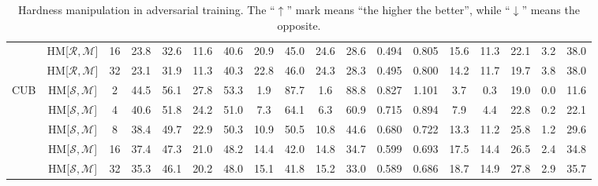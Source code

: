 \begin{table*}
{\begin{tabular}{c|cc|cccc|ccccc|ccccc|c}
\rowcolor{black!7}\cellcolor{white} & HM{[}$\mathcal{R},\mathcal{M}${]}  & 16 & 23.8 & 32.6 & 11.6 & 40.6 & 20.9 & 45.0 & 24.6 & 28.6 & 0.494 & 0.805 & 15.6 & 11.3 & 22.1 & 3.2 & 38.0\tabularnewline
 & HM{[}$\mathcal{R},\mathcal{M}${]} & 32 & 23.1 & 31.9 & 11.3 & 40.3 & 22.8 & 46.0 & 24.3 & 28.3 & 0.495 & 0.800 & 14.2 & 11.7 & 19.7 & 3.8 & 38.0\tabularnewline
\hline
\multirow{5}{*}{CUB} & HM{[}$\mathcal{S},\mathcal{M}${]} & 2 & 44.5 & 56.1 & 27.8 & 53.3 & 1.9 & 87.7 & 1.6 & 88.8 & 0.827 & 1.101 & 3.7 & 0.3 & 19.0 & 0.0 & 11.6\tabularnewline
\rowcolor{black!7}\cellcolor{white} & HM{[}$\mathcal{S},\mathcal{M}${]} & 4 & 40.6 & 51.8 & 24.2 & 51.0 & 7.3 & 64.1 & 6.3 & 60.9 & 0.715 & 0.894 & 7.9 & 4.4 & 22.8 & 0.2 & 22.1\tabularnewline
 & HM{[}$\mathcal{S},\mathcal{M}${]} & 8 & 38.4 & 49.7 & 22.9 & 50.3 & 10.9 & 50.5 & 10.8 & 44.6 & 0.680 & 0.722 & 13.3 & 11.2 & 25.8 & 1.2 & 29.6\tabularnewline
\rowcolor{black!7}\cellcolor{white} & HM{[}$\mathcal{S},\mathcal{M}${]} & 16 & 37.4 & 47.3 & 21.0 & 48.2 & 14.4 & 42.0 & 14.8 & 34.7 & 0.599 & 0.693 & 17.5 & 14.4 & 26.5 & 2.4 & 34.8\tabularnewline
 & HM{[}$\mathcal{S},\mathcal{M}${]} & 32 & 35.3 & 46.1 & 20.2 & 48.0 & 15.1 & 41.8 & 15.2 & 33.0 & 0.589 & 0.686 & 18.7 & 14.9 & 27.8 & 2.9 & 35.7\tabularnewline

	\bottomrule

\end{tabular}

} \vspace{-0.5em}
\caption{Hardness manipulation in adversarial training.
%
The ``$\uparrow$'' mark means ``the higher the better'', while ``$\downarrow$''
	means the opposite.
%
	}
\label{tab:hmeff}
%
\end{table*}
